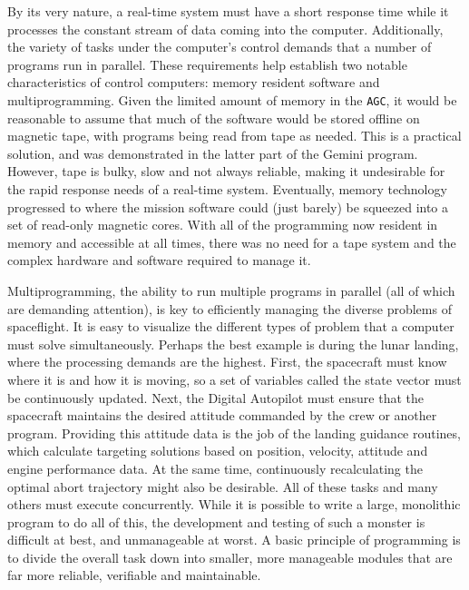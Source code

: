 \documentclass[refcap, oxford]{ahsan}
\begin{document}
By its very nature, a real-time system must have a short response time while it processes the constant stream of data coming into the computer. Additionally, the variety of tasks under the computer's control demands that a number of programs run in parallel. These requirements help establish two notable characteristics of control computers: memory resident software and multiprogramming. Given the limited amount of memory in the \texttt{AGC}, it would be reasonable to assume that much of the software would be stored offline on magnetic tape, with programs being read from tape as needed. This is a practical solution, and was demonstrated in the latter part of the Gemini program. However, tape is bulky, slow and not always reliable, making it undesirable for the rapid response needs of a real-time system. Eventually, memory technology progressed to where the mission software could (just barely) be squeezed into a set of read-only magnetic cores. With all of the programming now resident in memory and accessible at all times, there was no need for a tape system and the complex hardware and software required to manage it.

Multiprogramming, the ability to run multiple programs in parallel (all of which are demanding attention), is key to efficiently managing the diverse problems of spaceflight. It is easy to visualize the different types of problem that a computer must solve simultaneously. Perhaps the best example is during the lunar landing, where the processing demands are the highest. First, the spacecraft must know where it is and how it is moving, so a set of variables called the state vector must be continuously updated. Next, the Digital Autopilot must ensure that the spacecraft maintains the desired attitude commanded by the crew or another program. Providing this attitude data is the job of the landing guidance routines, which calculate targeting solutions based on position, velocity, attitude and engine performance data. At the same time, continuously recalculating the optimal abort trajectory might also be desirable. All of these tasks and many others must execute concurrently. While it is possible to write a large, monolithic program to do all of this, the development and testing of such a monster is difficult at best, and unmanageable at worst. A basic principle of programming is to divide the overall task down into smaller, more manageable modules that are far more reliable, verifiable and maintainable.
\end{document}
